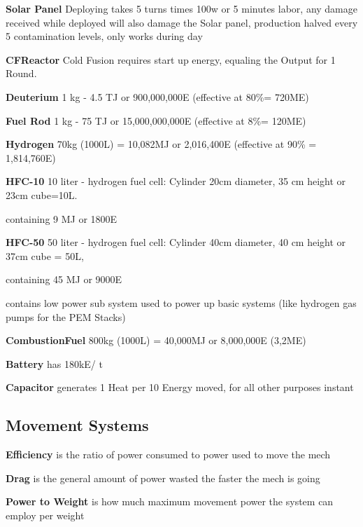 \textbf {Solar Panel} Deploying takes 5 turns times 100w or 5 minutes labor, any damage received while deployed
will also damage the Solar panel, production halved every 5 contamination levels, only works during day

\textbf {CFReactor} Cold Fusion requires start up energy, equaling the Output for 1 Round.

\textbf {Deuterium} 1 kg - 4.5 TJ or 900,000,000E (effective at 80\%= 720ME)

\textbf {Fuel Rod} 1 kg - 75 TJ or 15,000,000,000E (effective at 8\%= 120ME)

\textbf {Hydrogen} 70kg (1000L) = 10,082MJ or 2,016,400E (effective at 90\% = 1,814,760E)

\textbf {HFC-10} 10 liter - hydrogen fuel cell: Cylinder 20cm diameter,
35 cm height or 23cm cube=10L. \par
containing 9 MJ or 1800E

\textbf {HFC-50} 50 liter - hydrogen fuel cell: Cylinder 40cm diameter,
40 cm height or 37cm cube = 50L,
\par containing 45 MJ or 9000E\par
contains low power sub system used to power up basic systems (like hydrogen gas pumps for the PEM Stacks)

\textbf{CombustionFuel} 800kg (1000L) = 40,000MJ or 8,000,000E (3,2ME)

\textbf{Battery} has 180kE/ t

\textbf{Capacitor} generates 1 Heat per 10 Energy moved, for all other purposes instant

\subsection{Movement Systems}\label{subsec:movementsystems}

\textbf{Efficiency} is the ratio of power consumed to power used to move the mech

\textbf{Drag} is the general amount of power wasted the faster the mech is going

\textbf{Power to Weight} is how much maximum movement power the system can employ per weight

